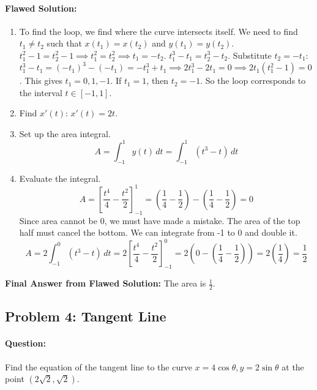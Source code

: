\documentclass{article}
\begin{document}
\paragraph{Flawed Solution:}
\begin{enumerate}
    \item To find the loop, we find where the curve intersects itself. We need to find $t_1 \neq t_2$ such that $x(t_1)=x(t_2)$ and $y(t_1)=y(t_2)$.
    $t_1^2-1 = t_2^2-1 \implies t_1^2 = t_2^2 \implies t_1 = -t_2$.
    $t_1^3-t_1 = t_2^3-t_2$. Substitute $t_2 = -t_1$:
    $t_1^3-t_1 = (-t_1)^3 - (-t_1) = -t_1^3 + t_1 \implies 2t_1^3 - 2t_1 = 0 \implies 2t_1(t_1^2-1)=0$.
    This gives $t_1 = 0, 1, -1$. If $t_1 = 1$, then $t_2 = -1$. So the loop corresponds to the interval $t \in [-1, 1]$.
    \item Find $x'(t)$: $x'(t) = 2t$.
    \item Set up the area integral.
    \[ A = \int_{-1}^1 y(t) \, dt = \int_{-1}^1 (t^3 - t) \, dt \]
    \item Evaluate the integral.
    \[ A = \left[ \frac{t^4}{4} - \frac{t^2}{2} \right]_{-1}^1 = \left(\frac{1}{4} - \frac{1}{2}\right) - \left(\frac{1}{4} - \frac{1}{2}\right) = 0 \]
    Since area cannot be 0, we must have made a mistake. The area of the top half must cancel the bottom. We can integrate from -1 to 0 and double it.
    \[ A = 2 \int_{-1}^0 (t^3-t) \, dt = 2 \left[ \frac{t^4}{4} - \frac{t^2}{2} \right]_{-1}^0 = 2 \left( 0 - (\frac{1}{4} - \frac{1}{2}) \right) = 2(\frac{1}{4}) = \frac{1}{2} \]
\end{enumerate}
\textbf{Final Answer from Flawed Solution:} The area is $\frac{1}{2}$.

\subsection{Problem 4: Tangent Line}
\paragraph{Question:} Find the equation of the tangent line to the curve $x=4\cos\theta, y=2\sin\theta$ at the point $(2\sqrt{2}, \sqrt{2})$.
\end{document}
